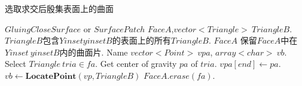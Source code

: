 \documentclass[a4paper]{book}
\renewcommand{\algorithmicrequire}{\textbf{输入:}}
\renewcommand{\algorithmicensure}{\textbf{输出:}}
\renewcommand{\algorithmicrequire}{\textbf{Input : }}
\renewcommand{\algorithmicrequire}{\textbf{Precondition : }}
\renewcommand{\algorithmicensure}{\textbf{Output : }}
\renewcommand{\algorithmicensure}{\textbf{Postcondition : }}
\numberwithin{equation}{chapter}
\theoremstyle{definition}
\begin{document}
\begin{algorithm}
	\caption{选取求交后殷集表面上的曲面}
	\begin{algorithmic}[1]
		\renewcommand{\algorithmicrequire}{\textbf{Input : }}
		\Require $GluingCloseSurface$ or $SurfacePatch$ $FaceA$,$vector<Triangle>\ TriangleB$.
		\renewcommand{\algorithmicrequire}{\textbf{Precondition : }}
		\Require $TriangleB$包含$Yinset yinsetB$的表面上的所有$TriangleB$.
		\renewcommand{\algorithmicensure}{\textbf{Output : }}
		\Ensure $FaceA$
		\renewcommand{\algorithmicensure}{\textbf{Postcondition : }}
		\Ensure 保留$FaceA$中在$Yinset\ yinsetB$内的曲面片.
		\State Name $vector<Point>\ vpa$, $array<char>\ vb$.
		\State Select $Triangle\ tria \in fa$.
		\State Get  center of gravity $pa$ of $tria$.
		\State $vpa[end] \gets pa$.
		\EndFor
		\State $vb \gets \textbf{LocatePoint}(vp,TriangleB)$
		\State $FaceA.erase(fa)$.
		\EndIf
		\EndFor
		\EndFunction
	\end{algorithmic}
\end{algorithm}
\end{document}
